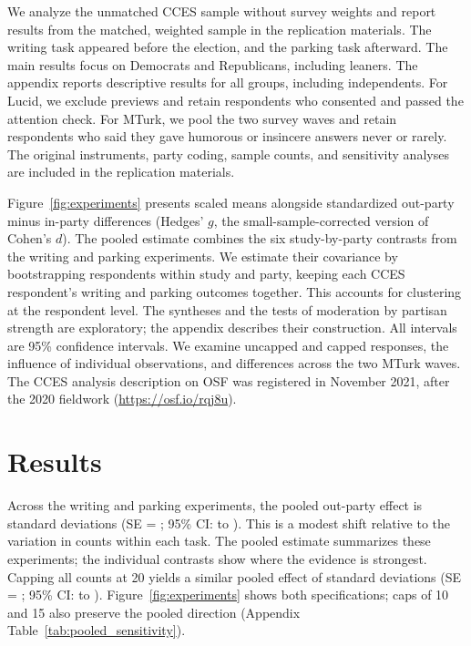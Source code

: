 \documentclass[12pt, letterpaper]{article}
\begin{document}
We analyze the unmatched CCES sample without survey weights and report results from the matched, weighted sample in the replication materials. The writing task appeared before the election, and the parking task afterward. The main results focus on Democrats and Republicans, including leaners. The appendix reports descriptive results for all groups, including independents. For Lucid, we exclude previews and retain respondents who consented and passed the attention check. For MTurk, we pool the two survey waves and retain respondents who said they gave humorous or insincere answers never or rarely. The original instruments, party coding, sample counts, and sensitivity analyses are included in the replication materials.

Figure~\ref{fig:experiments} presents scaled means alongside standardized out-party minus in-party differences (Hedges' $g$, the small-sample-corrected version of Cohen's $d$). The pooled estimate combines the six study-by-party contrasts from the writing and parking experiments. We estimate their covariance by bootstrapping respondents within study and party, keeping each CCES respondent's writing and parking outcomes together. This accounts for clustering at the respondent level. The syntheses and the tests of moderation by partisan strength are exploratory; the appendix describes their construction. All intervals are 95\% confidence intervals. We examine uncapped and capped responses, the influence of individual observations, and differences across the two MTurk waves. The CCES analysis description on OSF was registered in November 2021, after the 2020 fieldwork (\url{https://osf.io/rqj8u}).

\section{Results}

Across the writing and parking experiments, the pooled out-party effect is \PooledExperimentsAllpartisansEstimate{} standard deviations (SE = \PooledExperimentsAllpartisansSe{}; 95\% CI: \PooledExperimentsAllpartisansLower{} to \PooledExperimentsAllpartisansUpper{}). This is a modest shift relative to the variation in counts within each task. The pooled estimate summarizes these experiments; the individual contrasts show where the evidence is strongest. Capping all counts at 20 yields a similar pooled effect of \CappedPooledEstimate{} standard deviations (SE = \CappedPooledSe{}; 95\% CI: \CappedPooledLower{} to \CappedPooledUpper{}). Figure~\ref{fig:experiments} shows both specifications; caps of 10 and 15 also preserve the pooled direction (Appendix Table~\ref{tab:pooled_sensitivity}).
\end{document}
